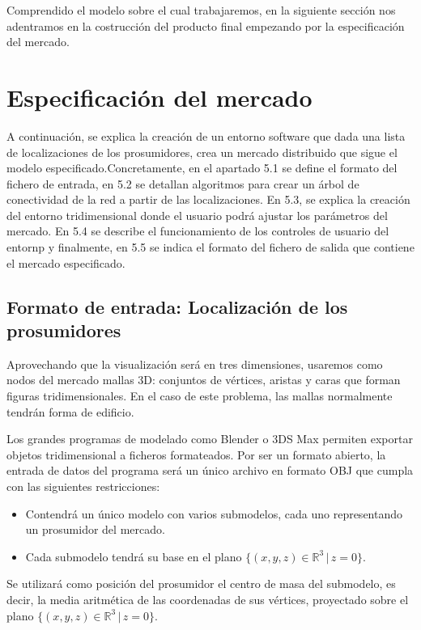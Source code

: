 \documentclass[12pt,a4paper,openright,oneside]{article}
\newcommand{\R}{\mathbb{R}}
\numberwithin{equation}{section}
\theoremstyle{definition}
\begin{document}
\vspace{1cm}

Comprendido el modelo sobre el cual trabajaremos, en la siguiente sección nos adentramos en la costrucción del producto final empezando por la especificación del mercado.
\newpage

\section{Especificación del mercado}
A continuación, se explica la creación de un entorno software que dada una lista de localizaciones de los prosumidores, crea un mercado distribuido que sigue el modelo especificado.Concretamente, en el apartado 5.1 se define el formato del fichero de entrada, en 5.2 se detallan algoritmos para crear un árbol de conectividad de la red a partir de las localizaciones. En 5.3, se explica la creación del entorno tridimensional donde el usuario podrá ajustar los parámetros del mercado. En 5.4 se describe el funcionamiento de los controles de usuario del entornp y finalmente, en 5.5 se indica el formato del fichero de salida que contiene el mercado especificado.

\subsection{Formato de entrada: Localización de los prosumidores}

Aprovechando que la visualización será en tres dimensiones, usaremos como nodos del mercado mallas 3D: conjuntos de vértices, aristas y caras que forman figuras tridimensionales. En el caso de este problema, las mallas normalmente tendrán forma de edificio.

Los grandes programas de modelado como Blender o 3DS Max permiten exportar objetos tridimensional a ficheros formateados. Por ser un formato abierto, la entrada de datos del programa será un único archivo en formato OBJ que cumpla con las siguientes restricciones:

\begin{itemize}
\item Contendrá un único modelo con varios submodelos, cada uno representando un prosumidor del mercado.
\item Cada submodelo tendrá su base en el plano $\{(x,y,z) \in \R^3 \, | \, z=0 \}$.
\end{itemize}

Se utilizará como posición del prosumidor el centro de masa del submodelo, es decir, la media aritmética de las coordenadas de sus vértices, proyectado sobre el plano $\{(x,y,z) \in \R^3 \, | \, z=0 \}$.
\end{document}
